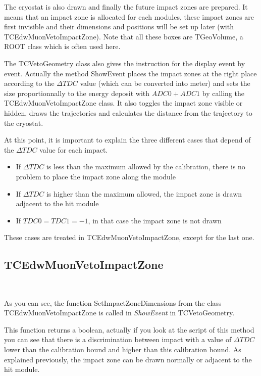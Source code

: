 \documentclass[12pt, a4paper]{article}
\begin{document}
The cryostat is also drawn and finally the future impact zones are prepared. It means that an impact zone is allocated for each modules, these impact zones are first invisible and their dimensions and positions will be set up later (with TCEdwMuonVetoImpactZone). Note that all these boxes are TGeoVolume, a ROOT class which is often used here.
 
The TCVetoGeometry class also gives the instruction for the display event by event. Actually the method ShowEvent places the impact zones at the right place according to the $ \Delta TDC $ value (which can be converted into meter) and sets the size proportionnally to the energy deposit with $ ADC0 + ADC1 $ by calling the TCEdwMuonVetoImpactZone class. It also toggles the impact zone visible or hidden, draws the trajectories and calculates the distance from the trajectory to the cryostat. 

At this point, it is important to explain the three different cases that depend of the $ \Delta TDC $ value for each impact. 
  
\begin{itemize}
\item If $ \Delta TDC $ is less than the maximum allowed by the calibration, there is no problem to place the impact zone along the module

\item If $ \Delta TDC $ is higher than the maximum allowed, the impact zone is drawn adjacent to the hit module

\item If $ TDC0=TDC1=-1 $, in that case the impact zone is not drawn
\end{itemize}

These cases are treated in TCEdwMuonVetoImpactZone, except for the last one.


\subsection{TCEdwMuonVetoImpactZone}

~


As you can see, the function SetImpactZoneDimensions from the class TCEdwMuonVetoImpactZone is called in \emph{ShowEvent} in TCVetoGeometry. 

This function returns a boolean, actually if you look at the script of this method you can see that there is a discrimination between impact with a value of $ \Delta TDC $ lower than the calibration bound and higher than this calibration bound. As explained previously, the impact zone can be drawn normally or adjacent to the hit module.
\end{document}
